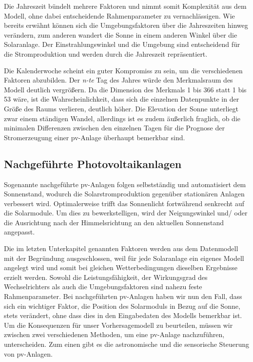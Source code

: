 \documentclass[12pt, a4paper]{article}
\begin{document}
Die Jahreszeit bündelt mehrere Faktoren und nimmt somit Komplexität aus dem Modell, ohne dabei entscheidende Rahmenparameter zu vernachlässigen. Wie bereits erwähnt können sich die Umgebungsfaktoren über die Jahreszeiten hinweg verändern, zum anderen wandert die Sonne in einem anderen Winkel über die Solaranlage. Der Einstrahlungswinkel und die Umgebung sind entscheidend für die Stromproduktion und werden durch die Jahreszeit repräsentiert.

 Die Kalenderwoche scheint ein guter Kompromiss zu sein, um die verschiedenen Faktoren abzubilden. Der \textit{n-te} Tag des Jahres würde den Merkmalsraum des Modell deutlich vergrößern. Da die Dimension des Merkmals 1 bis 366 statt 1 bis 53 wäre, ist die Wahrscheinlichkeit, dass sich die einzelnen Datenpunkte in der Größe des Raums verlieren, deutlich höher. Die Elevation der Sonne unterliegt zwar einem ständigen Wandel, allerdings ist es zudem äußerlich fraglich, ob die minimalen Differenzen zwischen den einzelnen Tagen für die Prognose der Stromerzeugung einer \ac{pv}-Anlage überhaupt bemerkbar sind.

 

\subsection{Nachgeführte Photovoltaikanlagen}
\label{subsec:tracked_systems}

Sogenannte nachgeführte \ac{pv}-Anlagen folgen selbstständig und automatisiert dem Sonnenstand, wodurch die Solarstromproduktion gegenüber stationären Anlagen verbessert wird. Optimalerweise trifft das Sonnenlicht fortwährend senkrecht auf die Solarmodule. Um dies zu bewerkstelligen, wird der Neigungswinkel und/ oder die Ausrichtung nach der Himmelsrichtung an den aktuellen Sonnenstand angepasst. 

Die im letzten Unterkapitel genannten Faktoren werden aus dem Datenmodell mit der Begründung ausgeschlossen, weil für jede Solaranlage ein eigenes Modell angelegt wird und somit bei gleichen Wetterbedingungen dieselben Ergebnisse erzielt werden. 
Sowohl die Leistungsfähigkeit, der Wirkungsgrad des Wechselrichters als auch die Umgebungsfaktoren sind nahezu feste Rahmenparameter. Bei nachgeführten \ac{pv}-Anlagen haben wir nun den Fall, dass sich ein wichtiger Faktor, die Position des Solarmoduls in Bezug auf die Sonne, stets verändert, ohne dass dies in den Eingabedaten des Modells bemerkbar ist. Um die Konsequenzen für unser Vorhersagemodell zu beurteilen, müssen wir zwischen zwei verschiedenen Methoden, um eine \ac{pv}-Anlage nachzuführen, unterscheiden. Zum einen gibt es die astronomische und die sensorische Steuerung von \ac{pv}-Anlagen. 
\end{document}
